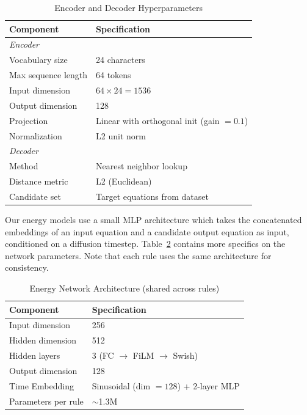 \documentclass{article}
\begin{document}
\begin{table}[H]
\centering
\caption{Encoder and Decoder Hyperparameters}
\label{tab:encoder}
\begin{tabular}{ll}
\toprule
\textbf{Component} & \textbf{Specification} \\
\midrule
\multicolumn{2}{l}{\textit{Encoder}} \\
Vocabulary size & 24 characters \\
Max sequence length & 64 tokens \\
Input dimension & $64 \times 24 = 1536$ \\
Output dimension & 128 \\
Projection & Linear with orthogonal init (gain $= 0.1$) \\
Normalization & L2 unit norm \\
\midrule
\multicolumn{2}{l}{\textit{Decoder}} \\
Method & Nearest neighbor lookup \\
Distance metric & L2 (Euclidean) \\
Candidate set & Target equations from dataset \\
\bottomrule
\end{tabular}
\end{table}

Our energy models use a small MLP architecture which takes the concatenated embeddings of an input equation and a candidate output equation as input, conditioned on a diffusion timestep. Table~\ref{tab:energy} contains more specifics on the network parameters. Note that each rule uses the same architecture for consistency.

\begin{table}[H]
\centering
\caption{Energy Network Architecture (shared across rules)}
\label{tab:energy}
\begin{tabular}{ll}
\toprule
\textbf{Component} & \textbf{Specification} \\
\midrule
Input dimension & 256  \\
Hidden dimension & 512 \\
Hidden layers & 3 (FC $\rightarrow$ FiLM $\rightarrow$ Swish) \\
Output dimension & 128 \\
Time Embedding & Sinusoidal (dim $= 128$) + 2-layer MLP \\
Parameters per rule & $\sim$1.3M \\
\bottomrule
\end{tabular}
\end{table}
\end{document}
